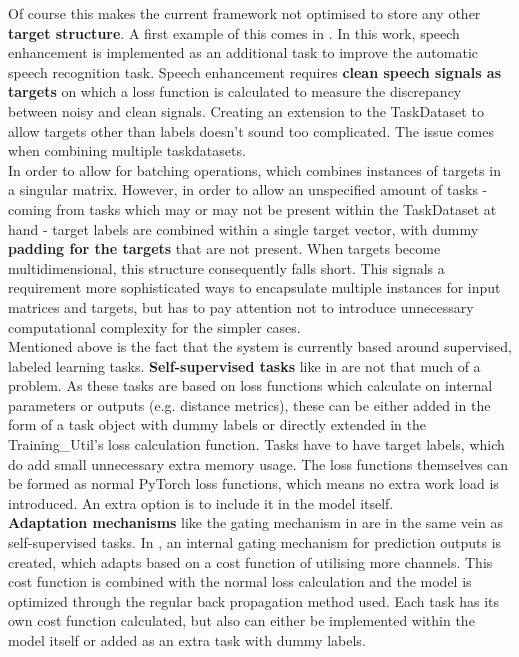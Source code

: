Of course this makes the current framework not optimised to store any other \textbf{target structure}. A first example of this comes in \cite{lu2004multitask}. In this work, speech enhancement is implemented as an additional task to improve the automatic speech recognition task. Speech enhancement requires \textbf{clean speech signals as targets} on which a loss function is calculated to measure the discrepancy between noisy and clean signals. Creating an extension to the TaskDataset to allow targets other than labels doesn't sound too complicated. The issue comes when combining multiple taskdatasets.\\

In order to allow for batching operations, which combines instances of targets in a singular matrix. However, in order to allow an unspecified amount of tasks - coming from tasks which may or may not be present within the TaskDataset at hand - target labels are combined within a single target vector, with dummy \textbf{padding for the targets} that are not present. When targets become multidimensional, this structure consequently falls short. This signals a requirement more sophisticated ways to encapsulate multiple instances for input matrices and targets, but has to pay attention not to introduce unnecessary computational complexity for the simpler cases. \\

Mentioned above is the fact that the system is currently based around supervised, labeled learning tasks. \textbf{Self-supervised tasks} like in \cite{lee2019label} are not that much of a problem. As these tasks are based on loss functions which calculate on internal parameters or outputs (e.g. distance metrics), these can be either added in the form of a task object with dummy labels or directly extended in the Training\_Util's loss calculation function. Tasks have to have target labels, which do add small unnecessary extra memory usage. The loss functions themselves can be formed as normal PyTorch loss functions, which means no extra work load is introduced. An extra option is to include it in the model itself.\\

\textbf{Adaptation mechanisms} like the gating mechanism in \cite{tagliasacchi2020multi} are in the same vein as self-supervised tasks. In \cite{tagliasacchi2020multi}, an internal gating mechanism for prediction outputs is created, which adapts based on a cost function of utilising more channels. This cost function is combined with the normal loss calculation and the model is optimized through the regular back propagation method used. Each task has its own cost function calculated, but also can either be implemented within the model itself or added as an extra task with dummy labels.\\

